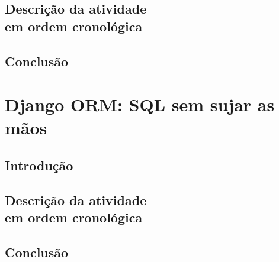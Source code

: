 \documentclass[a4paper]{report}
\begin{document}
        \section[Descrição atividade]{Descrição da atividade
        \\em ordem cronológica}

        \section{Conclusão}

    \chapter[Django ORM]{Django ORM: SQL sem sujar as mãos}

        \section{Introdução}

        \section[Descrição atividade]{Descrição da atividade
        \\em ordem cronológica}

        \section{Conclusão}
\end{document}
